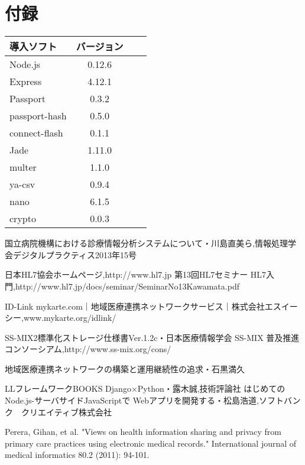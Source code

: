 \documentclass[12pt]{sotsuron}
\begin{document}
\section*{付録}
\begin{table}[htb]
	\begin{tabular}{|l|c|r|r|}\hline
	導入ソフト & バージョン \\ \hline \hline
	Node.js & 0.12.6 \\ \hline
	Express & 4.12.1 \\ \hline
	Passport & 0.3.2 \\ \hline
	passport-hash & 0.5.0 \\ \hline
	connect-flash & 0.1.1 \\ \hline
	Jade & 1.11.0 \\ \hline
	multer & 1.1.0  \\ \hline
	ya-csv & 0.9.4 \\ \hline
	nano & 6.1.5 \\ \hline
	crypto & 0.0.3  \\ \hline


	\end{tabular}
\end{table}





\begin{thebibliography}{12}
	 国立病院機構における診療情報分析システムについて・川島直美ら,情報処理学会デジタルプラクティス2013年15号


	 日本HL7協会ホームページ,http://www.hl7.jp
   第13回HL7セミナー HL7入門,http://www.hl7.jp/docs/seminar/SeminarNo13Kawamata.pdf

   ID-Link mykarte.com｜地域医療連携ネットワークサービス｜株式会社エスイーシー,www.mykarte.org/idlink/


	 SS-MIX2標準化ストレージ仕様書Ver.1.2c・日本医療情報学会
	 SS-MIX 普及推進コンソーシアム,http://www.ss-mix.org/cons/



	 地域医療連携ネットワークの構築と運用継続性の追求・石黒満久

   LLフレームワークBOOKS Django×Python・露木誠,技術評論社
   はじめてのNode.js-サーバサイドJavaScriptで Webアプリを開発する・松島浩道,ソフトバンク　クリエイティブ株式会社

   Perera, Gihan, et al. "Views on health information sharing and privacy from primary care practices using electronic medical records." International journal of medical informatics 80.2 (2011): 94-101.


\end{thebibliography}


\clearpage

\listoffigures
\clearpage

\listoftables
\clearpage
\end{document}
